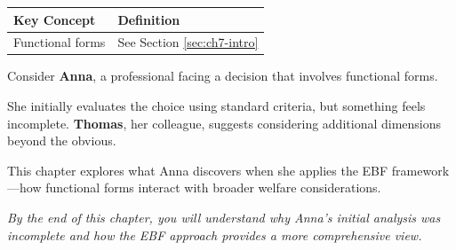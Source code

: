 %
%
%
%
%


\begin{tcolorbox}[
    colback=gray!5!white,
    colframe=gray!75!black,
    title={\textbf{Begriffe in diesem Kapitel}},
    fonttitle=\bfseries
]
\small
\begin{tabular}{@{}ll@{}}
\textbf{Key Concept} & \textbf{Definition} \\
\midrule
Functional forms & See Section \ref{sec:ch7-intro} \\
\end{tabular}
\end{tcolorbox}



\begin{tcolorbox}[
    colback=blue!5!white,
    colframe=blue!75!black,
    title={\textbf{Intuition: A Motivating Example}},
    fonttitle=\bfseries
]
Consider \textbf{Anna}, a professional facing a decision that involves functional forms.

She initially evaluates the choice using standard criteria, but something feels incomplete.
\textbf{Thomas}, her colleague, suggests considering additional dimensions beyond the obvious.

This chapter explores what Anna discovers when she applies the EBF framework---how
functional forms interact with broader welfare considerations.

\medskip
\textit{By the end of this chapter, you will understand why Anna's initial analysis
was incomplete and how the EBF approach provides a more comprehensive view.}
\end{tcolorbox}



